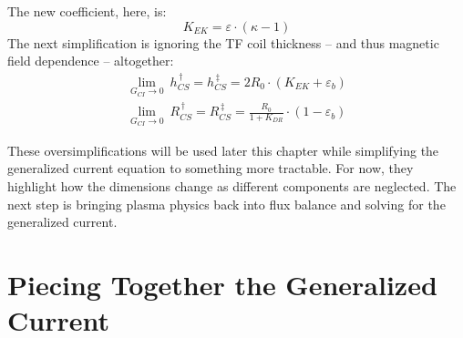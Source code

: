 The new  coefficient, here, is:
\begin{equation}
	K_{EK} = \varepsilon \cdot \left( \kappa - 1 \right)
\end{equation}
The next simplification is ignoring the TF coil thickness -- and thus magnetic field dependence -- altogether:
\begin{gather}
	\label{eq:hcs_simple}
	\underset{G_{CI} \to 0}{\lim} \ h_{CS}^{\,\dagger} = h_{CS}^{\,\ddagger} = 2 R_0 \cdot \left( K_{EK} + \varepsilon_b \right) \\
	\label{eq:rcs_simple}
	\underset{G_{CI} \to 0}{\lim} \ R_{CS}^{\,\dagger} = R_{CS}^{\,\ddagger} = \frac{ R_0 }{ 1 + K_{DR} } \cdot \left( 1 - \varepsilon_b  \right)
\end{gather}

These oversimplifications will be used later this chapter while simplifying the generalized current equation to something more tractable. For now, they highlight how the dimensions change as different components are neglected. The next step is bringing plasma physics back into flux balance and solving for the generalized current.

\section{Piecing Together the Generalized Current}

